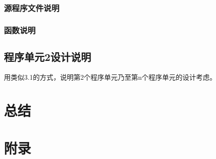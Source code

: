 \documentclass[UTF8,a4paper,12pt]{ctexart}
\newcommand{\blankline}{\par\vspace{1.2em}}
\begin{document}
\subsubsection{源程序文件说明}
\blankline

\subsubsection{函数说明}
\blankline

\subsection{程序单元2设计说明}

用类似3.1的方式，说明第2个程序单元乃至第n个程序单元的设计考虑。

\section{总结}
\blankline

\section{附录}
\blankline
\end{document}
